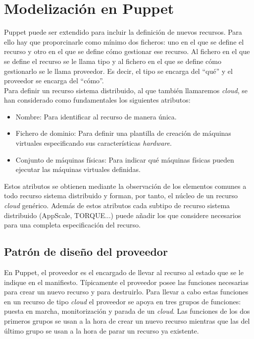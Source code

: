 \section{Modelización en Puppet}
\label{sec:modelado-puppet}

Puppet puede ser extendido para incluir la definición de nuevos recursos. Para ello hay que proporcinarle como mínimo dos ficheros: uno en el que se define el recurso y otro en el que se define cómo gestionar ese recurso. Al fichero en el que se define el recurso se le llama tipo y al fichero en el que se define cómo gestionarlo se le llama proveedor. Es decir, el tipo se encarga del ``qué'' y el proveedor se encarga del ``cómo''.\\

Para definir un recurso sistema distribuido, al que también llamaremos \emph{cloud}, se han considerado como fundamentales los siguientes atributos:

\begin{itemize}
\item Nombre: Para identificar al recurso de manera única.
\item Fichero de dominio: Para definir una plantilla de creación de máquinas virtuales especificando sus características \emph{hardware}.
\item Conjunto de máquinas físicas: Para indicar qué máquinas físicas pueden ejecutar las máquinas virtuales definidas.
\end{itemize}

Estos atributos se obtienen mediante la observación de los elementos comunes a todo recurso sistema distribuido y forman, por tanto, el núcleo de un recurso \emph{cloud} genérico. Además de estos atributos cada subtipo de recurso sistema distribuido (AppScale, TORQUE...) puede añadir los que considere necesarios para una completa especificación del recurso.


\subsection{Patrón de diseño del proveedor}
\label{sec:modelado-proveedor}

En Puppet, el proveedor es el encargado de llevar al recurso al estado que se le indique en el manifiesto. Típicamente el proveedor posee las funciones necesarias para crear un nuevo recurso y para destruirlo. Para llevar a cabo estas funciones en un recurso de tipo \emph{cloud} el proveedor se apoya en tres grupos de funciones: puesta en marcha, monitorización y parada de un \emph{cloud}. Las funciones de los dos primeros grupos se usan a la hora de crear un nuevo recurso mientras que las del último grupo se usan a la hora de parar un recurso ya existente. \\

